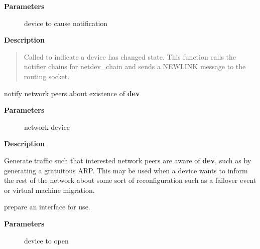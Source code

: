 \documentclass[a4paper,8pt,english]{sphinxmanual}
\begin{document}
\textbf{Parameters}
\begin{description}
\item[{}] \leavevmode
device to cause notification

\end{description}

\textbf{Description}
\begin{quote}

Called to indicate a device has changed state. This function calls
the notifier chains for netdev\_chain and sends a NEWLINK message
to the routing socket.
\end{quote}

\begin{fulllineitems}
\label{networking/kapi:c.netdev_notify_peers}
notify network peers about existence of \textbf{dev}

\end{fulllineitems}


\textbf{Parameters}
\begin{description}
\item[{}] \leavevmode
network device

\end{description}

\textbf{Description}

Generate traffic such that interested network peers are aware of
\textbf{dev}, such as by generating a gratuitous ARP. This may be used when
a device wants to inform the rest of the network about some sort of
reconfiguration such as a failover event or virtual machine
migration.

\begin{fulllineitems}
\label{networking/kapi:c.dev_open}
prepare an interface for use.

\end{fulllineitems}


\textbf{Parameters}
\begin{description}
\item[{}] \leavevmode
device to open

\end{description}
\end{document}
